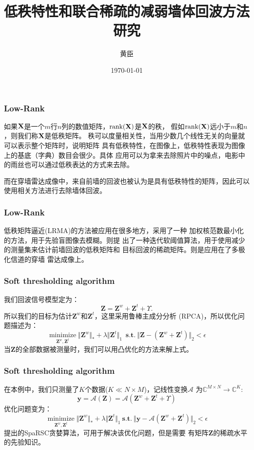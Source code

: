 \documentclass[12pt]{beamer}
\begin{document}
 
\title{低秩特性和联合稀疏的减弱墙体回波方法研究}  
\author{黄臣}  
\date{\today}  
\frame{\titlepage}  
\begin{frame}
  \frametitle{Low-Rank}
  如果$\bf X$是一个$m$行$n$列的数值矩阵，$\rm {rank(}\bf X\rm {)}$是$\bf X$的秩，
  假如$\rm {rank(}\bf X\rm {)}$远小于$m$和$n$，则我们称$\bf X$是低秩矩阵。
  秩可以度量相关性，当用少数几个线性无关的向量就可以表示整个矩阵时，说明矩阵
  具有低秩特性，在图像上，低秩特性表现为图像上的基底（字典）数目会很少。具体
  应用可以为拿来去除照片中的噪点，电影中的雨丝也可以通过低秩表达的方式来去除。

  而在穿墙雷达成像中，来自前墙的回波也被认为是具有低秩特性的矩阵，因此可以
  使用相关方法进行去除墙体回波。
\end{frame}
\begin{frame}
  \frametitle{Low-Rank}
  低秩矩阵逼近(LRMA)的方法被应用在很多地方，\citep{Ren2016Image}采用了一种
  加权核范数最小化的方法，用于先验盲图像去模糊。\citep{Tang2016Radar}则提
  出了一种迭代软阈值算法，用于使用减少的测量集来估计前墙回波的低秩矩阵和
  目标回波的稀疏矩阵。\citep{Bouzerdoum2017A}则是应用在了多极化信道的穿墙
  雷达成像上。
\end{frame}
\begin{frame}
  \frametitle{Soft thresholding algorithm}
  我们回波信号模型定为：
  \begin{equation} 
	\mathbf{Z}=\mathbf Z^{w}+\mathbf{Z}^{t}+\Upsilon.
  \end{equation}
  所以我们的目标为估计$\mathbf{Z}^w$和$\mathbf{Z}^{t}$，这里采用鲁棒主成分分析
  (RPCA)，所以优化问题描述为：
  \begin{equation} 
	\mathop{\text{minimize}}\limits_{\mathbf{Z}^{w},\mathbf{Z}^{t}} \Vert \mathbf{Z}^{w}\Vert_{*}+\lambda\Vert \mathbf{Z}^{t}\Vert_{1}\ \; \mathbf{s.t}.\ \Vert \mathbf{Z}-(\mathbf{Z}^{w}+\mathbf{Z}^{t})\Vert_{2} < \epsilon 
  \end{equation}
  当$\mathbf{Z}$的全部数据被测量时，我们可以用凸优化的方法来解上式\citep{Chandrasekaran2009Rank}。 
\end{frame}
\begin{frame}
  \frametitle{Soft thresholding algorithm}
  在本例中，我们只测量了$K$个数据($K \ll N \times M$)，记线性变换$\mathcal{A}$
  为$\mathbb{C}^{M\times\!N}\to\mathbb{C}^{K}$:
  \begin{equation*}
	\mathbf{y}=\mathcal{A}(\mathbf{Z})=\mathcal{A}(\mathbf{Z}^{w}+\mathbf{Z}^{t}+\Upsilon)
  \end{equation*}
  优化问题变为：
  \begin{equation}
	\mathop{\text{minimize}}\limits_{\mathbf{Z}^{w},\mathbf{Z}^{t}} \Vert \mathbf{Z}^{w}\Vert_{*}+\lambda\Vert \mathbf{Z}^{t}\Vert_{1}\ \mathbf{s.t}.\ \Vert \mathbf{y}-\mathcal{A}(\mathbf{Z}^{w}+\mathbf{Z}^{t})\Vert_{2} < \epsilon
  \end{equation}
  \citep{Waters2011SpaRCS}提出的SpaRSC贪婪算法，可用于解决该优化问题，但是需要
  有矩阵$\mathbf{Z}$的稀疏水平的先验知识。
\end{frame}
\end{document}
